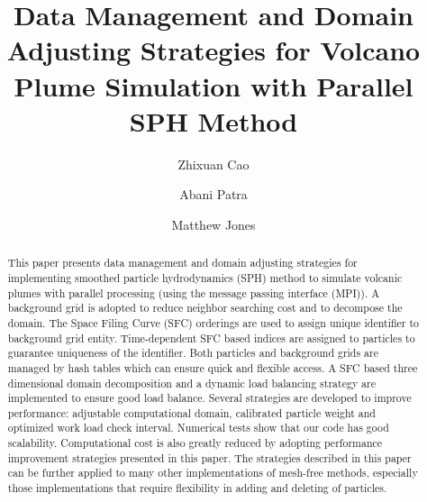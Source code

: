 \documentclass[procedia]{easychair}
\title{Data Management and Domain Adjusting Strategies for Volcano Plume Simulation with Parallel SPH Method}
\author{
    Zhixuan Cao\inst{1}%
\and
    Abani Patra\inst{1}
\and
    Matthew Jones\inst{2}%
}
\institute{
Department of MAE,
University at Buffalo, Buffalo, New York, U.S.A.\\
\and
Center for Computational Research,
University at Buffalo, Buffalo, New York, U.S.A.\\
 }
\begin{document}
\maketitle


\begin{abstract}
This paper presents data management and domain adjusting strategies for implementing smoothed particle hydrodynamics (SPH) method to simulate volcanic plumes with parallel processing (using the message passing interface (MPI)). 
A background grid is adopted to reduce neighbor searching cost and to decompose the domain. The Space Filing Curve (SFC) orderings are used to assign unique identifier to background grid entity. Time-dependent SFC based indices are assigned to particles to guarantee uniqueness of the identifier.  
Both particles and background grids are managed by hash tables which can ensure quick and flexible access.
A SFC based three dimensional domain decomposition and a dynamic load balancing strategy are implemented to ensure good load balance. 
Several strategies are developed to improve performance: adjustable computational domain, calibrated particle weight and optimized work load check interval. 
Numerical tests show that our code has good scalability. Computational cost is also greatly reduced by adopting performance improvement strategies presented in this paper. 
The strategies described in this paper can be further applied to many other implementations of mesh-free methods, especially those implementations that require flexibility in adding and deleting of particles.
\end{abstract}


%
%


\end{document}

